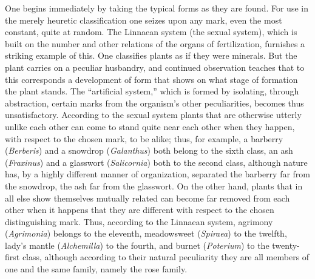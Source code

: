\documentclass[12pt]{book}
\begin{document}
One begins immediately by taking the typical forms as they are found. For use in the
merely heuretic classification one seizes upon any mark, even the most constant, quite
at random. The Linnaean system (the sexual system), which is built on the number and
other relations of the organs of fertilization, furnishes a striking example of this.
One classifies plants as if they were minerals. But the plant carries on a peculiar
husbandry, and continued observation teaches that to this corresponds a development of
form that shows on what stage of formation the plant stands. The ``artificial system,''
which is formed by isolating, through abstraction, certain marks from the organism's
other peculiarities, becomes thus unsatisfactory. According to the sexual system plants
that are otherwise utterly unlike each other can come to stand quite near each other when
they happen, with respect to the chosen mark, to be alike; thus, for example, a barberry
(\textit{Berberis}) and a snowdrop (\textit{Galanthus}) both belong to the sixth class,
an ash (\textit{Fraxinus}) and a glasswort (\textit{Salicornia}) both to the second
class, although nature has, by a highly different manner of organization, separated the
barberry far from the snowdrop, the ash far from the glasswort. On the other hand, plants
that in all else show themselves mutually related can become far removed from each other
when it happens that they are different with respect to the chosen distinguishing mark.
Thus, according to the Linnaean system, agrimony (\textit{Agrimonia}) belongs to the
eleventh, meadowsweet (\textit{Spiraea}) to the twelfth, lady's mantle
(\textit{Alchemilla}) to the fourth, and burnet (\textit{Poterium}) to the twenty-first
class, although according to their natural peculiarity they are all members of one and the
same family, namely the rose family.
\end{document}
